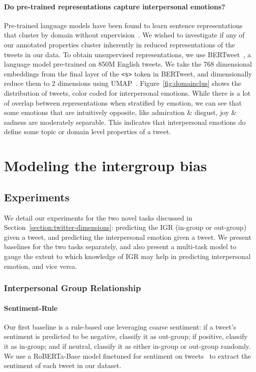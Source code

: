 \paragraph{Do pre-trained representations capture interpersonal emotions?}

Pre-trained language models have been found to learn sentence representations that cluster by domain without supervision~\citep{aharoni-goldberg-2020-unsupervised}. We wished to investigate if any of our annotated properties cluster inherently in reduced representations of the tweets in our data. To obtain unsupervised representations, we use BERTweet~\citep{nguyen_bertweet_2020}, a language model pre-trained on 850M English tweets. We take the 768 dimensional embeddings from the final layer of the \texttt{<s>} token in BERTweet, and dimensionally reduce them to 2 dimensions using UMAP~\citep{sainburg2021parametric}. Figure~\ref{fig:domainclus} shows the distribution of tweets, color coded for interpersonal emotions. While there is a lot of overlap between representations when stratified by emotion, we can see that some emotions that are intuitively opposite, like admiration \& disgust, joy \& sadness are moderately separable. This indicates that interpersonal emotions do define some topic or domain level properties of a tweet.

\section{Modeling the intergroup bias}
\label{twitter:model}

\subsection{Experiments}

We detail our experiments for the two novel tasks discussed in Section~\ref{section:twitter-dimensions}: predicting the IGR (in-group or out-group) given a tweet, and predicting the interpersonal emotion given a tweet. We present baselines for the two tasks separately, and also present a multi-task model to gauge the extent to which knowledge of IGR may help in predicting interpersonal emotion, and vice versa.

\subsubsection{Interpersonal Group Relationship}

\paragraph{Sentiment-Rule} Our first baseline is a rule-based one leveraging coarse sentiment: if a tweet's sentiment is predicted to be negative, classify it as out-group; if positive, classify it as in-group; and if neutral, classify it as either in-group or out-group randomly. We use a RoBERTa-Base model finetuned for sentiment on tweets~\citep{barbieri-etal-2020-tweeteval} to extract the sentiment of each tweet in our dataset.
    

